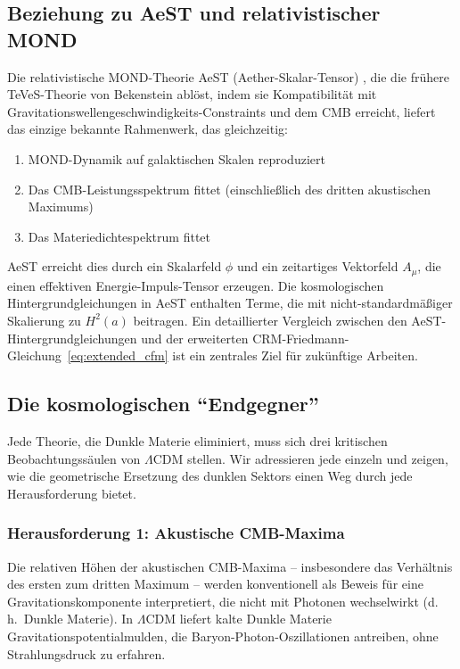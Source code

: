 \documentclass[aps,prd,twocolumn,superscriptaddress,nofootinbib,floatfix]{revtex4-2}
\begin{document}
\subsection{Beziehung zu AeST und relativistischer MOND}

Die relativistische MOND-Theorie AeST (Aether-Skalar-Tensor) \cite{Skordis2021}, die die frühere TeVeS-Theorie von Bekenstein \cite{Bekenstein2004} ablöst, indem sie Kompatibilität mit Gravitationswellengeschwindigkeits-Constraints und dem CMB erreicht, liefert das einzige bekannte Rahmenwerk, das gleichzeitig:
\begin{enumerate}
\item MOND-Dynamik auf galaktischen Skalen reproduziert
\item Das CMB-Leistungsspektrum fittet (einschließlich des dritten akustischen Maximums)
\item Das Materiedichtespektrum fittet
\end{enumerate}

AeST erreicht dies durch ein Skalarfeld $\phi$ und ein zeitartiges Vektorfeld $A_\mu$, die einen effektiven Energie-Impuls-Tensor erzeugen. Die kosmologischen Hintergrundgleichungen in AeST enthalten Terme, die mit nicht-standardmäßiger Skalierung zu $H^2(a)$ beitragen. Ein detaillierter Vergleich zwischen den AeST-Hintergrundgleichungen und der erweiterten CRM-Friedmann-Gleichung~\eqref{eq:extended_cfm} ist ein zentrales Ziel für zukünftige Arbeiten.

\subsection{Die kosmologischen "`Endgegner"'}
\label{subsec:endgegner}

Jede Theorie, die Dunkle Materie eliminiert, muss sich drei kritischen Beobachtungssäulen von $\Lambda$CDM stellen. Wir adressieren jede einzeln und zeigen, wie die geometrische Ersetzung des dunklen Sektors einen Weg durch jede Herausforderung bietet.

\subsubsection{Herausforderung 1: Akustische CMB-Maxima}

Die relativen Höhen der akustischen CMB-Maxima -- insbesondere das Verhältnis des ersten zum dritten Maximum -- werden konventionell als Beweis für eine Gravitationskomponente interpretiert, die nicht mit Photonen wechselwirkt (d.\,h.\ Dunkle Materie). In $\Lambda$CDM liefert kalte Dunkle Materie Gravitationspotentialmulden, die Baryon-Photon-Oszillationen antreiben, ohne Strahlungsdruck zu erfahren.
\end{document}
